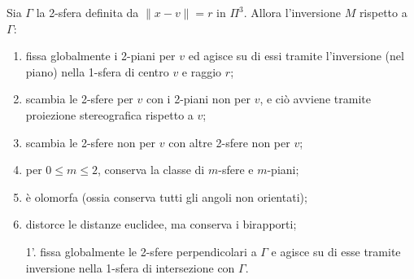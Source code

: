 \begin{teorema}
	Sia $\Gamma$ la 2-sfera definita da $\|x-v\| = r$ in $\Pi^{3}$. Allora l'inversione $M$ rispetto a $\Gamma$:
	\begin{enumerate}
		\item fissa globalmente i 2-piani per $v$ ed agisce su di essi tramite l'inversione (nel piano) nella 1-sfera di centro $v$ e raggio $r$;
		\item scambia le 2-sfere per $v$ con i 2-piani non per $v$, e ciò avviene tramite proiezione stereografica rispetto a $v$;
		\item scambia le 2-sfere non per $v$ con altre 2-sfere non per $v$;
		\item per $0\leq m\leq 2$, conserva la classe di $m$-sfere e $m$-piani;
		\item è olomorfa (ossia conserva tutti gli angoli non orientati);
		\item distorce le distanze euclidee, ma conserva i birapporti;
		\item[1'.] fissa globalmente le 2-sfere perpendicolari a $\Gamma$ e agisce su di esse tramite inversione nella 1-sfera di intersezione con $\Gamma$.
	\end{enumerate}
\end{teorema}
